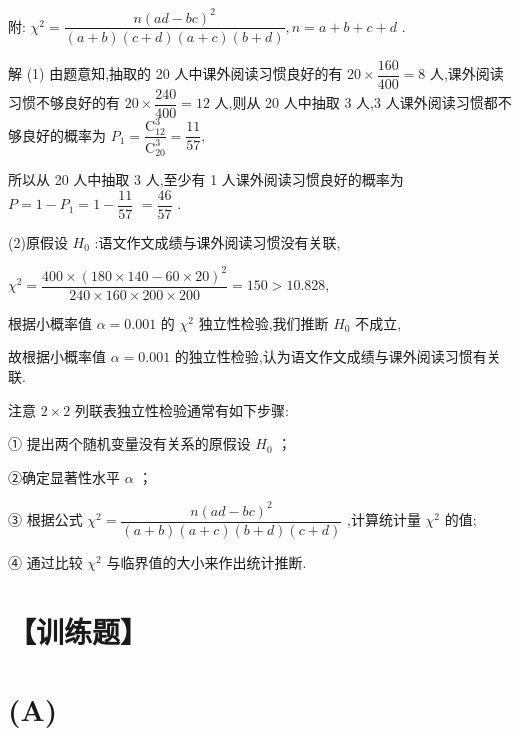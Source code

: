 附: ${\chi }^{2} = \dfrac{n{\left( ad - bc\right) }^{2}}{\left( {a + b}\right) \left( {c + d}\right) \left( {a + c}\right) \left( {b + d}\right) },n = a + b + c + d$ .

\begin{center}
\end{center}

解 (1) 由题意知,抽取的 20 人中课外阅读习惯良好的有 ${20} \times  \dfrac{160}{400} = 8$ 人,课外阅读习惯不够良好的有 ${20} \times  \dfrac{240}{400} = {12}$ 人,则从 20 人中抽取 3 人,3 人课外阅读习惯都不够良好的概率为 ${P}_{1} = \dfrac{{\mathrm{C}}_{12}^{3}}{{\mathrm{C}}_{20}^{3}} = \dfrac{11}{57},$

所以从 20 人中抽取 3 人,至少有 1 人课外阅读习惯良好的概率为 $P = 1 - {P}_{1} = 1 - \dfrac{11}{57}$  $= \dfrac{46}{57}$ .

(2)原假设 ${H}_{0}$ :语文作文成绩与课外阅读习惯没有关联,

${\chi }^{2} = \dfrac{{400} \times  {\left( {180} \times  {140} - {60} \times  {20}\right) }^{2}}{{240} \times  {160} \times  {200} \times  {200}} = {150} > {10.828},$

根据小概率值 $\alpha  = {0.001}$ 的 ${\chi }^{2}$ 独立性检验,我们推断 ${H}_{0}$ 不成立,

故根据小概率值 $\alpha  = {0.001}$ 的独立性检验,认为语文作文成绩与课外阅读习惯有关联.

注意 $2 \times  2$ 列联表独立性检验通常有如下步骤:

① 提出两个随机变量没有关系的原假设 ${H}_{0}$ ；

②确定显著性水平 $\alpha$ ；

③ 根据公式 ${\chi }^{2} = \dfrac{n{\left( ad - bc\right) }^{2}}{\left( {a + b}\right) \left( {a + c}\right) \left( {b + d}\right) \left( {c + d}\right) }$ ,计算统计量 ${\chi }^{2}$ 的值;

④ 通过比较 ${\chi }^{2}$ 与临界值的大小来作出统计推断.

\section*{【训练题】}

\section*{(A)}

